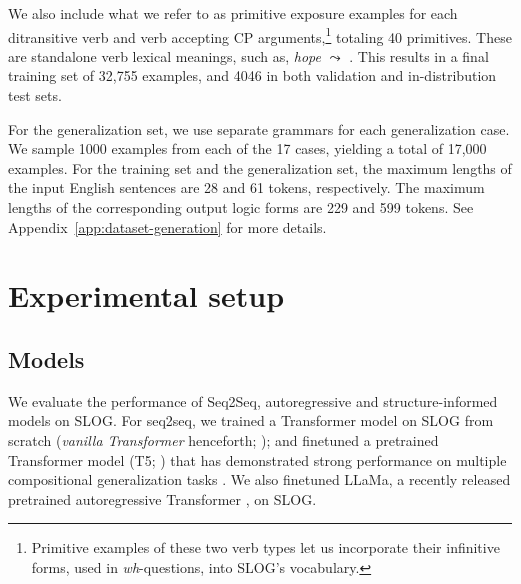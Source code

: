 We also include what we refer to as primitive exposure examples for each ditransitive verb and verb accepting 
CP arguments,\footnote{Primitive examples of these two verb types let us incorporate their infinitive forms, used in \emph{wh}-questions, into SLOG's vocabulary.} totaling 40 primitives. These are standalone verb lexical meanings, such as, \textit{hope} $\leadsto$ . This results in a final training set of 32,755 examples, and 4046 in both validation and in-distribution test sets. 

For the generalization set, we use separate grammars for each generalization case. We sample 1000 examples from each of the 17 cases, yielding a total of 17,000 examples. For the training set and the generalization set, the maximum lengths of the input English sentences are 28 and 61 tokens, respectively. The maximum lengths of the corresponding output logic forms are 229 and 599 tokens. See Appendix~\ref{app:dataset-generation} for more details.

\section{Experimental setup} \label{sec:slog_ex_setup}
\subsection{Models}
We evaluate the performance of Seq2Seq, autoregressive and structure-informed models on SLOG. For seq2seq, we trained a Transformer model on SLOG from scratch (\textit{vanilla Transformer} henceforth; \citealt{NIPS2017_3f5ee243}); and finetuned a pretrained Transformer model (T5; \citealt{2020t5}) that has demonstrated strong performance on multiple compositional generalization tasks \citep{herzig2021unlocking}. We also finetuned LLaMa, a recently released pretrained autoregressive Transformer \citep{touvron2023llama}, on SLOG. 


